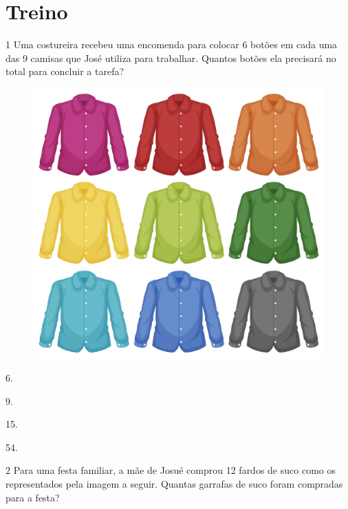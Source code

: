 \section*{Treino}

\num{1} Uma costureira recebeu uma encomenda para colocar 6 botões em
cada uma das 9 camisas que José utiliza para trabalhar. Quantos botões
ela precisará no total para concluir a tarefa?

\begin{figure}[htpb!]
\centering
\includegraphics[width=.8\textwidth]{./media/image16d.jpeg}
\end{figure}

\begin{escolha}
    \item 6.
    \item 9.
    \item 15.
    \item 54.
\end{escolha}

\pagebreak

\num{2} Para uma festa familiar, a mãe de Josué comprou 12 fardos de
suco como os representados pela imagem a seguir. Quantas garrafas de suco foram compradas para a festa? 


